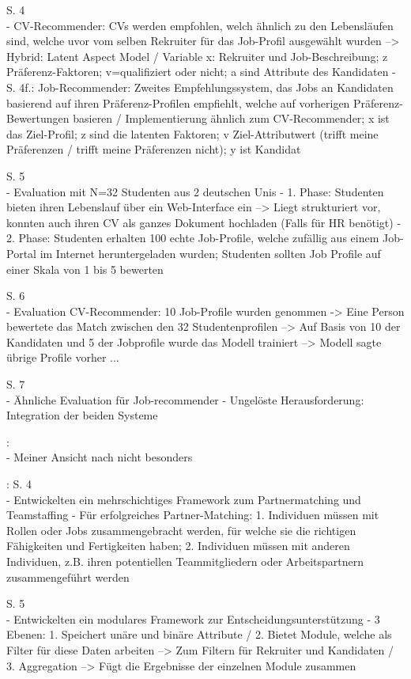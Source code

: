 S. 4\\
- CV-Recommender: CVs werden empfohlen, welch ähnlich zu den Lebensläufen sind, welche uvor vom selben Rekruiter für das Job-Profil ausgewählt wurden --> Hybrid: Latent Aspect Model / Variable x: Rekruiter und Job-Beschreibung; z Präferenz-Faktoren; v=qualifiziert oder nicht; a sind Attribute des Kandidaten
- S. 4f.: Job-Recommender: Zweites Empfehlungssystem, das Jobs an Kandidaten basierend auf ihren Präferenz-Profilen empfiehlt, welche auf vorherigen Präferenz-Bewertungen basieren / Implementierung ähnlich zum CV-Recommender; x ist das Ziel-Profil; z sind die latenten Faktoren; v Ziel-Attributwert (trifft meine Präferenzen / trifft meine Präferenzen nicht); y ist Kandidat

S. 5\\
- Evaluation mit N=32 Studenten aus 2 deutschen Unis
- 1. Phase: Studenten bieten ihren Lebenslauf über ein Web-Interface ein --> Liegt strukturiert vor, konnten auch ihren CV als ganzes Dokument hochladen (Falls für HR benötigt)
- 2. Phase: Studenten erhalten 100 echte Job-Profile, welche zufällig aus einem Job-Portal im Internet heruntergeladen wurden; Studenten sollten Job Profile auf einer Skala von 1 bis 5 bewerten

S. 6\\
- Evaluation CV-Recommender: 10 Job-Profile wurden genommen -> Eine Person bewertete das Match zwischen den 32 Studentenprofilen --> Auf Basis von 10 der Kandidaten und 5 der Jobprofile wurde das Modell trainiert --> Modell sagte übrige Profile vorher ...

S. 7\\
- Ähnliche Evaluation für Job-recommender
- Ungelöste Herausforderung: Integration der beiden Systeme

\textcite{faerber:2003}:\\
- Meiner Ansicht nach nicht besonders

\textcite{keim:2007}:
S. 4\\
- Entwickelten ein mehrschichtiges Framework zum Partnermatching und Teamstaffing
- Für erfolgreiches Partner-Matching: 1. Individuen müssen mit Rollen oder Jobs zusammengebracht werden, für welche sie die richtigen Fähigkeiten und Fertigkeiten haben; 2. Individuen müssen mit anderen Individuen, z.B. ihren potentiellen Teammitgliedern oder Arbeitspartnern zusammengeführt werden

S. 5\\
- Entwickelten ein modulares Framework zur Entscheidungsunterstützung
- 3 Ebenen: 1. Speichert unäre und binäre Attribute / 2. Bietet Module, welche als Filter für diese Daten arbeiten --> Zum Filtern für Rekruiter und Kandidaten / 3. Aggregation --> Fügt die Ergebnisse der einzelnen Module zusammen

